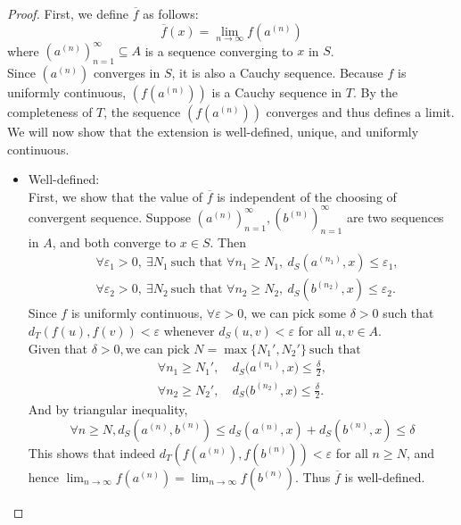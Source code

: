 \begin{proof}
    First, we define $\overline{f}$ as follows:
    \[
    \overline{f}(x) = \lim_{n \to \infty} f(a^{(n)})
    \]
    where $(a^{(n)})_{n=1}^\infty \subseteq A$ is a sequence converging to $x$ in $S$. \\
    Since $(a^{(n)})$ converges in $S$, it is also a Cauchy sequence. 
    Because $f$ is uniformly continuous, $(f(a^{(n)}))$ is a Cauchy sequence in $T$. 
    By the completeness of $T$, the sequence $(f(a^{(n)}))$ converges and thus defines a limit. \\[6pt]
    We will now show that the extension is well-defined, unique, and uniformly continuous.


    \begin{itemize}
        \item Well-defined: \\
        First, we show that the value of $\overline{f}$ is independent of the choosing of convergent sequence.
        Suppose $(a^{(n)})_{n=1}^\infty, (b^{(n)})_{n=1}^\infty$ are two sequences in $A$, and both converge to $x \in S$.
        Then
        \[
        \begin{aligned}
        &\forall \varepsilon_1 > 0, \ \exists N_1 \ \text{such that } 
           \forall n_1 \ge N_1, \ d_S(a^{(n_1)}, x) \le \varepsilon_1, \\[6pt]
        &\forall \varepsilon_2 > 0, \ \exists N_2 \ \text{such that } 
           \forall n_2 \ge N_2, \ d_S(b^{(n_2)}, x) \le \varepsilon_2.
        \end{aligned}
        \]
        Since $f$ is uniformly continuous, $\forall \varepsilon > 0$, we can pick some $\delta > 0$ such that $d_T(f(u), f(v)) < \varepsilon$ whenever $d_S(u, v) < \varepsilon$ for all $u, v \in A$. \\
        Given that $\delta > 0, \text{we can pick } N = \max\{N_1', N_2'\} \ \text{such that}$
        \[
        \begin{aligned}
        \forall n_1 \ge N_1',\ & d_S\!\bigl(a^{(n_1)}, x\bigr) \le \tfrac{\delta}{2}, \\[6pt]
        \forall n_2 \ge N_2',\ & d_S\!\bigl(b^{(n_2)}, x\bigr) \le \tfrac{\delta}{2}.
        \end{aligned}
        \]
        And by triangular inequality,
        \[
        \forall n \ge N, d_S(a^{(n)}, b^{(n)}) \le d_S(a^{(n)}, x) + d_S(b^{(n)}, x) \le \delta
        \]
        This shows that indeed $d_T(f(a^{(n)}), f(b^{(n)})) < \varepsilon$ for all $n \ge N$, and hence $\lim_{n \to \infty} f(a^{(n)}) =  \lim_{n \to \infty} f(b^{(n)})$. Thus $\overline{f}$ is well-defined.


\end{itemize}
\end{proof}
